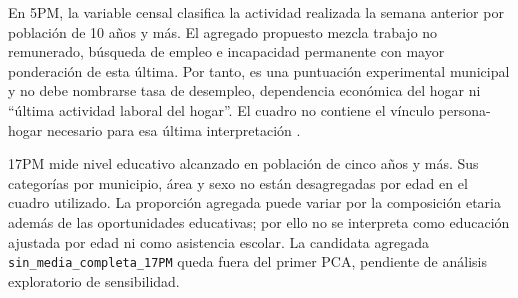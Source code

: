 En 5PM, la variable censal clasifica la actividad realizada la semana anterior por población de 10 años y más. El agregado propuesto mezcla trabajo no remunerado, búsqueda de empleo e incapacidad permanente con mayor ponderación de esta última. Por tanto, es una puntuación experimental municipal y no debe nombrarse tasa de desempleo, dependencia económica del hogar ni \enquote{última actividad laboral del hogar}. El cuadro no contiene el vínculo persona-hogar necesario para esa última interpretación \citep{dane_5pm}.

17PM mide nivel educativo alcanzado en población de cinco años y más. Sus categorías por municipio, área y sexo no están desagregadas por edad en el cuadro utilizado. La proporción agregada puede variar por la composición etaria además de las oportunidades educativas; por ello no se interpreta como educación ajustada por edad ni como asistencia escolar. La candidata agregada \texttt{sin\_media\_completa\_17PM} queda fuera del primer PCA, pendiente de análisis exploratorio de sensibilidad.
